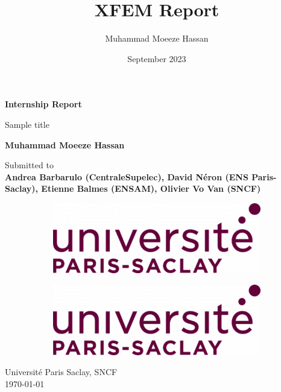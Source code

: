 \documentclass[11pt]{report}
\title{XFEM Report}
\author{Muhammad Moeeze Hassan}
\date{September 2023}
\begin{document}
\dominitoc

\begin{titlepage}
    \begin{center}
        \vspace*{1cm}
            
        \Huge
        \textbf{Internship Report}
            
        \vspace{0.5cm}
        \LARGE
        Sample title

            
        \vspace{1cm}
            
        \textbf{Muhammad Moeeze Hassan}
            
        \vfill
            
        Submitted to\\
        \textbf{Andrea Barbarulo (CentraleSupelec), David Néron (ENS Paris-Saclay), Etienne Balmes (ENSAM), Olivier Vo Van (SNCF)}
            
        \vspace{0.4cm}
            
        \begin{figure}[htb]
            \centering
            \begin{subfigure}[htb]{0.20\textwidth}
                \centering
                \includegraphics[width=\textwidth]{logo.png}
            \end{subfigure}
            \begin{subfigure}[htb]{0.10\textwidth}
                \centering
                \includegraphics[width=\textwidth]{logo.png}
            \end{subfigure}
        \end{figure}            
        \Large
        Université Paris Saclay, SNCF\\
        \today \par \vspace{-0.1cm}            
    \end{center}
\end{titlepage}
\end{document}

